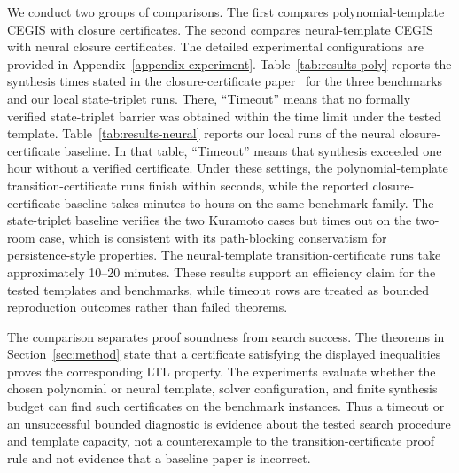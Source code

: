 We conduct two groups of comparisons. The first compares polynomial-template CEGIS with closure certificates. The second compares neural-template CEGIS with neural closure certificates. The detailed experimental configurations are provided in Appendix~\ref{appendix-experiment}. Table~\ref{tab:results-poly} reports the synthesis times stated in the closure-certificate paper~\cite{murali2024closure} for the three benchmarks and our local state-triplet runs. There, ``Timeout'' means that no formally verified state-triplet barrier was obtained within the time limit under the tested template. Table~\ref{tab:results-neural} reports our local runs of the neural closure-certificate baseline. In that table, ``Timeout'' means that synthesis exceeded one hour without a verified certificate. Under these settings, the polynomial-template transition-certificate runs finish within seconds, while the reported closure-certificate baseline takes minutes to hours on the same benchmark family. The state-triplet baseline verifies the two Kuramoto cases but times out on the two-room case, which is consistent with its path-blocking conservatism for persistence-style properties. The neural-template transition-certificate runs take approximately 10--20 minutes. These results support an efficiency claim for the tested templates and benchmarks, while timeout rows are treated as bounded reproduction outcomes rather than failed theorems.

The comparison separates proof soundness from search success. The theorems in Section~\ref{sec:method} state that a certificate satisfying the displayed inequalities proves the corresponding LTL property. The experiments evaluate whether the chosen polynomial or neural template, solver configuration, and finite synthesis budget can find such certificates on the benchmark instances. Thus a timeout or an unsuccessful bounded diagnostic is evidence about the tested search procedure and template capacity, not a counterexample to the transition-certificate proof rule and not evidence that a baseline paper is incorrect.

